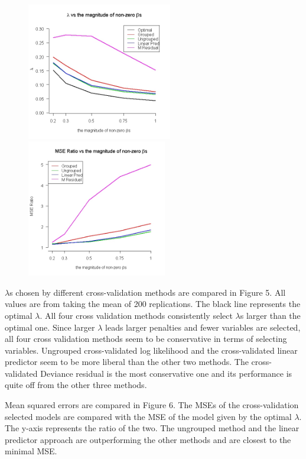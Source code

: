 \documentclass{article}\usepackage[]{graphicx}\usepackage[]{color}
\begin{document}
   \begin{figure}[h]
   \centering
    \begin{minipage}[b]{0.4\textwidth}
      \centering
		  \includegraphics[height= 6cm ]{./figures/05.jpeg}
      \caption{ }
     \end{minipage}
     \begin{minipage}[b]{0.4\textwidth}
      \centering
		  \includegraphics[height= 6cm ]{./figures/06.jpeg}
      \caption{ }
      \end{minipage}	
   \end{figure}	
   
    $\lambda$s chosen by different cross-validation methods are compared in Figure 5. All values are from taking the mean of 200 replications. The black line represents the optimal $\lambda$. All four cross validation methods consistently select $\lambda$s larger than the optimal one. Since larger $\lambda$ leads larger penalties and fewer variables are selected, all four cross validation methods seem to be conservative in terms of selecting variables. Ungrouped cross-validated log likelihood and the cross-validated linear predictor seem to be more liberal than the other two methods. The cross-validated Deviance residual is the most conservative one and its performance is quite off from the other three methods.

   Mean squared errors are compared in Figure 6. The MSEs of the cross-validation selected models are compared with the MSE of the model given by the optimal $\lambda$. The y-axis represents the ratio of the two. The ungrouped method and the linear predictor approach are outperforming the other methods and are closest to the minimal MSE.
\end{document}
